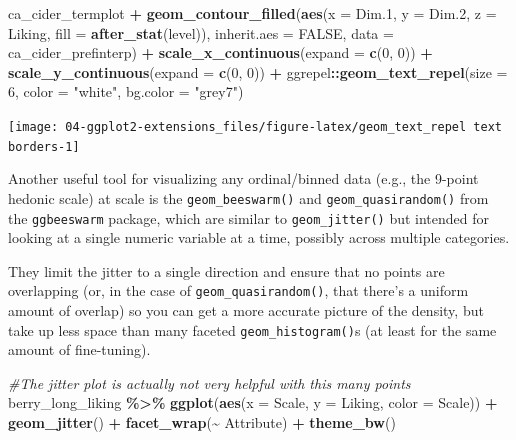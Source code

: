 \documentclass[
]{book}
\newenvironment{Shaded}{\begin{snugshade}}{\end{snugshade}}
\newcommand{\AttributeTok}[1]{\textcolor[rgb]{0.13,0.29,0.53}{#1}}
\newcommand{\CommentTok}[1]{\textcolor[rgb]{0.56,0.35,0.01}{\textit{#1}}}
\newcommand{\ConstantTok}[1]{\textcolor[rgb]{0.56,0.35,0.01}{#1}}
\newcommand{\DecValTok}[1]{\textcolor[rgb]{0.00,0.00,0.81}{#1}}
\newcommand{\FloatTok}[1]{\textcolor[rgb]{0.00,0.00,0.81}{#1}}
\newcommand{\FunctionTok}[1]{\textcolor[rgb]{0.13,0.29,0.53}{\textbf{#1}}}
\newcommand{\NormalTok}[1]{#1}
\newcommand{\SpecialCharTok}[1]{\textcolor[rgb]{0.81,0.36,0.00}{\textbf{#1}}}
\newcommand{\StringTok}[1]{\textcolor[rgb]{0.31,0.60,0.02}{#1}}
\begin{document}
\begin{Shaded}
\begin{Highlighting}[]
\NormalTok{ca\_cider\_termplot }\SpecialCharTok{+}
  \FunctionTok{geom\_contour\_filled}\NormalTok{(}\FunctionTok{aes}\NormalTok{(}\AttributeTok{x =}\NormalTok{ Dim}\FloatTok{.1}\NormalTok{, }\AttributeTok{y =}\NormalTok{ Dim}\FloatTok{.2}\NormalTok{, }\AttributeTok{z =}\NormalTok{ Liking, }\AttributeTok{fill =} \FunctionTok{after\_stat}\NormalTok{(level)),}
                  \AttributeTok{inherit.aes =} \ConstantTok{FALSE}\NormalTok{,}
                  \AttributeTok{data =}\NormalTok{ ca\_cider\_prefinterp) }\SpecialCharTok{+} 
  \FunctionTok{scale\_x\_continuous}\NormalTok{(}\AttributeTok{expand =} \FunctionTok{c}\NormalTok{(}\DecValTok{0}\NormalTok{, }\DecValTok{0}\NormalTok{)) }\SpecialCharTok{+}
  \FunctionTok{scale\_y\_continuous}\NormalTok{(}\AttributeTok{expand =} \FunctionTok{c}\NormalTok{(}\DecValTok{0}\NormalTok{, }\DecValTok{0}\NormalTok{)) }\SpecialCharTok{+}
\NormalTok{  ggrepel}\SpecialCharTok{::}\FunctionTok{geom\_text\_repel}\NormalTok{(}\AttributeTok{size =} \DecValTok{6}\NormalTok{, }\AttributeTok{color =} \StringTok{"white"}\NormalTok{, }\AttributeTok{bg.color =} \StringTok{"grey7"}\NormalTok{)}
\end{Highlighting}
\end{Shaded}

\begin{center}\texttt{[image: 04-ggplot2-extensions\_files/figure-latex/geom\_text\_repel text borders-1]} \end{center}

Another useful tool for visualizing any ordinal/binned data (e.g., the 9-point hedonic scale) at scale is the \texttt{geom\_beeswarm()} and \texttt{geom\_quasirandom()} from the \texttt{ggbeeswarm} package, which are similar to \texttt{geom\_jitter()} but intended for looking at a single numeric variable at a time, possibly across multiple categories.

They limit the jitter to a single direction and ensure that no points are overlapping (or, in the case of \texttt{geom\_quasirandom()}, that there's a uniform amount of overlap) so you can get a more accurate picture of the density, but take up less space than many faceted \texttt{geom\_histogram()}s (at least for the same amount of fine-tuning).

\begin{Shaded}
\begin{Highlighting}[]
\CommentTok{\#The jitter plot is actually not very helpful with this many points}
\NormalTok{berry\_long\_liking }\SpecialCharTok{\%\textgreater{}\%}
  \FunctionTok{ggplot}\NormalTok{(}\FunctionTok{aes}\NormalTok{(}\AttributeTok{x =}\NormalTok{ Scale, }\AttributeTok{y =}\NormalTok{ Liking, }\AttributeTok{color =}\NormalTok{ Scale)) }\SpecialCharTok{+}
  \FunctionTok{geom\_jitter}\NormalTok{() }\SpecialCharTok{+}
  \FunctionTok{facet\_wrap}\NormalTok{(}\SpecialCharTok{\textasciitilde{}}\NormalTok{ Attribute) }\SpecialCharTok{+}
  \FunctionTok{theme\_bw}\NormalTok{()}
\end{Highlighting}
\end{Shaded}
\end{document}
